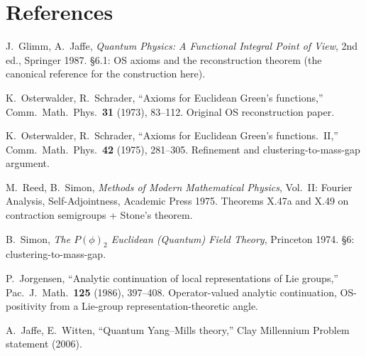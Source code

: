 \section*{References}

\noindent[GJ87] J.~Glimm, A.~Jaffe, \emph{Quantum Physics: A
Functional Integral Point of View}, 2nd ed., Springer 1987.
\S6.1: OS axioms and the reconstruction theorem (the canonical
reference for the construction here).

\noindent[OS73] K.~Osterwalder, R.~Schrader, ``Axioms for Euclidean
Green's functions,'' Comm.\ Math.\ Phys.\ \textbf{31} (1973),
83--112.  Original OS reconstruction paper.

\noindent[OS75] K.~Osterwalder, R.~Schrader, ``Axioms for Euclidean
Green's functions.~II,'' Comm.\ Math.\ Phys.\ \textbf{42} (1975),
281--305.  Refinement and clustering-to-mass-gap argument.

\noindent[RS-II] M.~Reed, B.~Simon, \emph{Methods of Modern
Mathematical Physics}, Vol.~II: Fourier Analysis, Self-Adjointness,
Academic Press 1975.  Theorems X.47a and X.49 on contraction
semigroups + Stone's theorem.

\noindent[Sim74] B.~Simon, \emph{The $P(\phi)_2$ Euclidean (Quantum)
Field Theory}, Princeton 1974.  \S6: clustering-to-mass-gap.

\noindent[Jor86] P.~Jorgensen, ``Analytic continuation of local
representations of Lie groups,'' Pac.\ J.\ Math.\ \textbf{125}
(1986), 397--408.  Operator-valued analytic continuation,
OS-positivity from a Lie-group representation-theoretic angle.

\noindent[JW06] A.~Jaffe, E.~Witten, ``Quantum Yang--Mills theory,''
Clay Millennium Problem statement (2006).
